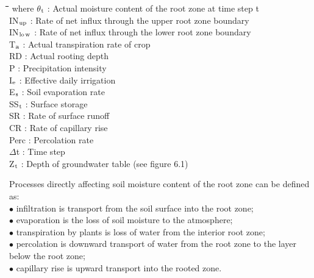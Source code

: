 \documentclass[11pt]{article}
\begin{document}
\nwln
\begin{tabbing}
\hspace{1.27cm}\=\hspace{1.27cm}\=\hspace{1.27cm}\=\hspace{1.27cm}\=%
\hspace{1.27cm}\=\hspace{1.27cm}\=\hspace{1.27cm}\=\hspace{1.27cm}\=%
\hspace{1.27cm}\=\hspace{1.27cm}\=\kill
where\> $\theta$$_{{\rm t}}$\> : Actual moisture content of the root zone at time step t\> \> \> \> \> \> \> \>  [cm$^{{\rm 3}}$ cm$^{{\rm -3}}$]\\
\>IN$_{{\rm up}}$\> : Rate of net influx through the upper root zone boundary\> \> \> \> \> \> \> \> [cm d$^{{\rm -1}}$]\\
\>IN$_{{\rm lo}}$$_{{\rm w}}$\> : Rate of net influx through the lower root zone boundary\> \> \> \> \> \> \> \> [cm d$^{{\rm -1}}$]\\
\>T$_{{\rm a}}$\> : Actual transpiration rate of crop \> \> \> \> \> \> \> \> [cm d$^{{\rm -1}}$]\\
\>RD\> : Actual rooting depth\> \> \> \> \> \> \> \> [cm]\\
\>P\> : Precipitation intensity\> \> \> \> \> \> \> \> [cm d$^{{\rm -1}}$]\\
\>I$_{{\rm e}}$\> : Effective daily irrigation\> \> \> \> \> \> \> \> [cm d$^{{\rm -1}}$]\\
\>E$_{{\rm s}}$\> : Soil evaporation rate \> \> \> \> \> \> \> \> [cm d$^{{\rm -1}}$]\\
\>SS$_{{\rm t}}$\> : Surface storage\> \> \> \> \> \> \> \> [cm]\\
\>SR\> : Rate of surface runoff\> \> \> \> \> \> \> \> [cm d$^{{\rm -1}}$]\\
\>CR\> : Rate of capillary rise\> \> \> \> \> \> \> \> [cm d$^{{\rm -1}}$]\\
\>Perc\> : Percolation rate\> \> \> \> \> \> \> \> [cm d$^{{\rm -1}}$]\\
\>$\Delta$t\> : Time step\> \> \> \> \> \> \> \> [d]\\
\>Z$_{{\rm t}}$\> : Depth of groundwater table (see figure 6.1)\> \> \> \> \> \> \> \> [cm]
\end{tabbing}

\bigskip
Processes directly affecting soil moisture content of the root zone can be defined as:\\
$\bullet$ infiltration is transport from the soil surface into the root zone;\\
$\bullet$ evaporation is the loss of soil moisture to the atmosphere;\\
$\bullet$ transpiration by plants is loss of water from the interior root zone;\\
$\bullet$ percolation is downward transport of water from the root zone to the layer below the
root zone;\\
$\bullet$ capillary rise is upward transport into the rooted zone.
\end{document}
